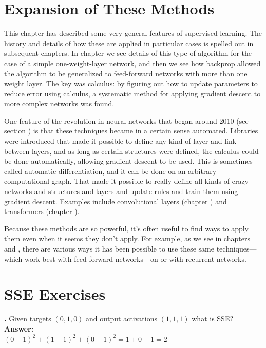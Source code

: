  \section{Expansion of These Methods}

 This chapter has described some very general features of supervised learning. The history and details of how these are applied in particular cases is spelled out in subsequent chapters.  In chapter  we see details of this type of algorithm for the case of a simple one-weight-layer network, and then we see how backprop allowed the algorithm to be generalized to feed-forward networks with more than one weight layer. The key was calculus: by figuring out how to update parameters to reduce error using calculus, a systematic method for applying gradient descent to more complex networks was found.

One feature of the revolution in neural networks that began around 2010 (see section ) is that these techniques became in a certain sense automated. Libraries were introduced that made it possible to define any kind of layer and link between layers, and as long as certain structures were defined, the calculus could be done automatically, allowing gradient descent to be used.  This is sometimes called automatic differentiation, and it can be done on an arbitrary computational graph.  That made it possible to really define all kinds of crazy networks and structures and layers and update rules and train them using gradient descent. Examples include convolutional layers (chapter ) and transformers  (chapter ).

Because these methods are so powerful, it's often useful to find ways to apply them even when it seems they don't apply. For example, as we see in chapters  and , there are various ways it has been possible to use these same techniques---which work best with feed-forward networks---on or with recurrent networks.

\section{SSE Exercises}


\noindent
{}
{\bf \theSSECounter.}  Given targets $(0,1,0)$ and output activations $(1,1,1)$ what is SSE? \\
{\bf Answer:}  \\
$(0-1)^2 + (1-1)^2 + (0-1)^2 = 1 + 0 + 1 = 2$
\bigskip

